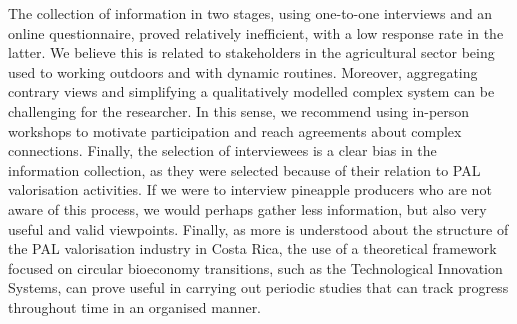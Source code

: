 The collection of information in two stages, using one-to-one interviews and an online questionnaire, proved relatively inefficient, with a low response rate in the latter. We believe this is related to stakeholders in the agricultural sector being used to working outdoors and with dynamic routines. Moreover, aggregating contrary views and simplifying a qualitatively modelled complex system can be challenging for the researcher. In this sense, we recommend using in-person workshops to motivate participation and reach agreements about complex connections. Finally, the selection of interviewees is a clear bias in the information collection, as they were selected because of their relation to PAL valorisation activities. If we were to interview pineapple producers who are not aware of this process, we would perhaps gather less information, but also very useful and valid viewpoints. Finally, as more is understood about the structure of the PAL valorisation industry in Costa Rica, the use of a theoretical framework focused on circular bioeconomy transitions, such as the Technological Innovation Systems, can prove useful in carrying out periodic studies that can track progress throughout time in an organised manner. 
